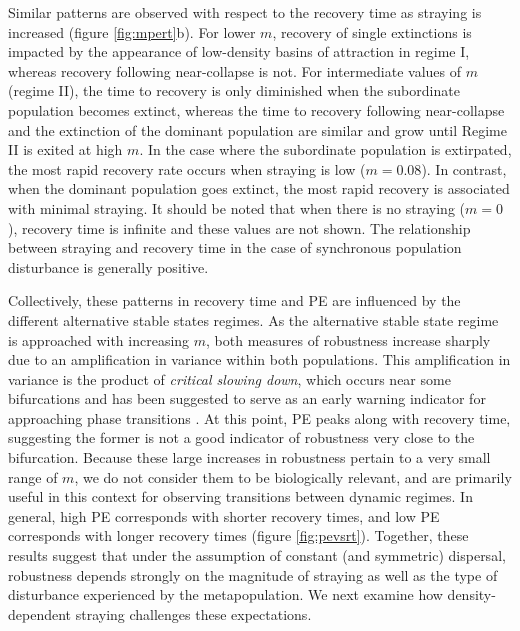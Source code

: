 \documentclass{revtex4}
\begin{document}
Similar patterns are observed with respect to the recovery time as straying is increased (figure \ref{fig:mpert}b).
For lower $m$, recovery of single extinctions is impacted by the appearance of low-density basins of attraction in regime I, whereas recovery following near-collapse is not.
For intermediate values of $m$ (regime II), the time to recovery is only diminished when the subordinate population becomes extinct, whereas the time to recovery following near-collapse and the extinction of the dominant population are similar and grow until Regime II is exited at high $m$.
In the case where the subordinate population is extirpated, the most rapid recovery rate occurs when straying is low ($m = 0.08$). 
In contrast, when the dominant population goes extinct, the most rapid recovery is associated with minimal straying. 
It should be noted that when there is no straying ($m = 0$), recovery time is infinite and these values are not shown. 
The relationship between straying and recovery time in the case of synchronous population disturbance is generally positive.


Collectively, these patterns in recovery time and PE are influenced by the different alternative stable states regimes. 
As the alternative stable state regime is approached with increasing $m$, both measures of robustness increase sharply due to an amplification in variance within both populations.
This amplification in variance is the product of \emph{critical slowing down}, which occurs near some bifurcations \citep{Scheffer:2009gg} and has been suggested to serve as an early warning indicator for approaching phase transitions \citep{Scheffer:2009gg,Lade:2012eu,Anonymous:2013br,Dakos:2014br,Krkosek:2014ch}.
At this point, PE peaks along with recovery time, suggesting the former is not a good indicator of robustness very close to the bifurcation.
Because these large increases in robustness pertain to a very small range of $m$, we do not consider them to be biologically relevant, and are primarily useful in this context for observing transitions between dynamic regimes.
In general, high PE corresponds with shorter recovery times, and low PE corresponds with longer recovery times (figure \ref{fig:pevsrt}).
Together, these results suggest that under the assumption of constant (and symmetric) dispersal, robustness depends strongly on the magnitude of straying as well as the type of disturbance experienced by the metapopulation.
We next examine how density-dependent straying challenges these expectations.\\
\end{document}
